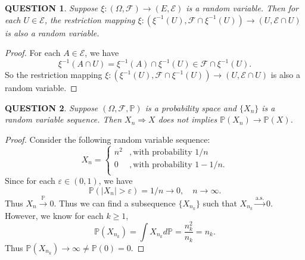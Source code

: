 \documentclass[12pt]{article}
\renewcommand{\(}{\left(}%
\renewcommand{\)}{\right)}%
\renewcommand{\[}{\left[}%
\renewcommand{\]}{\right]}%
\newcommand{\p}{\mathbb{P}}
\newcommand{\f}{\mathscr{F}}
\newtheorem{question}{QUESTION}[section]}
\newtheorem{proof}{Proof.}}
\begin{document}
  \begin{question}
   Suppose $\xi:(\Omega,\f )\to(E,\mathscr{E} )$ is a random variable. Then for each $U\in\mathscr{E}$, the restriction mapping $\xi:(\xi^{-1}(U),\f\cap\xi^{-1}(U)  )\to(U ,\mathscr{E}\cap U )$ is also a random variable.
  \end{question}
  \begin{proof}
   For each $A\in\mathscr{E}$, we have
   \begin{equation*}
    \xi^{-1}(A\cap U)=\xi^{-1}(A)\cap \xi^{-1}(U)\in\f\cap\xi^{-1}(U).
   \end{equation*}
   So the restriction mapping $\xi:(\xi^{-1}(U),\f\cap\xi^{-1}(U)  )\to(U ,\mathscr{E}\cap U )$ is also a random variable.
  \end{proof}

  \begin{question}
   Suppose $(\Omega,\f,\p )$ is a probability space and $\{X_n\}$ is a random variable sequence. Then $X_n\Rightarrow X$ does not implies $\p(X_n)\to \p(X)$.
  \end{question}
  \begin{proof}
   Consider the following random variable sequence:
   \begin{equation*}
    X_n=
    \begin{cases}
     n^2&,\mbox{with probability }1/n\\
     0&,\mbox{with probability }1-1/n.\\
    \end{cases}
   \end{equation*}
   Since for each $\varepsilon\in(0,1)$, we have
   \begin{equation*}
    \p(|X_n|>\varepsilon )=1/n\to 0,\quad n\to\infty.
   \end{equation*}
   Thus $X_n\overset{\p}{\to }0$. Thus we can find a subsequence $\{X_{n_k}\}$ such that $X_{n_k}\overset{\mathrm{a.s.}}{\to}0$. However, we know for each $k\geq 1$,
   \begin{equation*}
    \p(X_{n_k})=\int X_{n_k}d\p=\frac{n^2_k}{n_k}=n_k.
   \end{equation*}
   Thus $\p(X_{n_k})\to\infty \neq \p(0)=0$.
  \end{proof}
\end{document}
